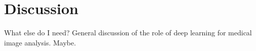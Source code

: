 \chapter{Discussion}

What else do I need? General discussion of the role of deep learning for medical
image analysis. Maybe.
